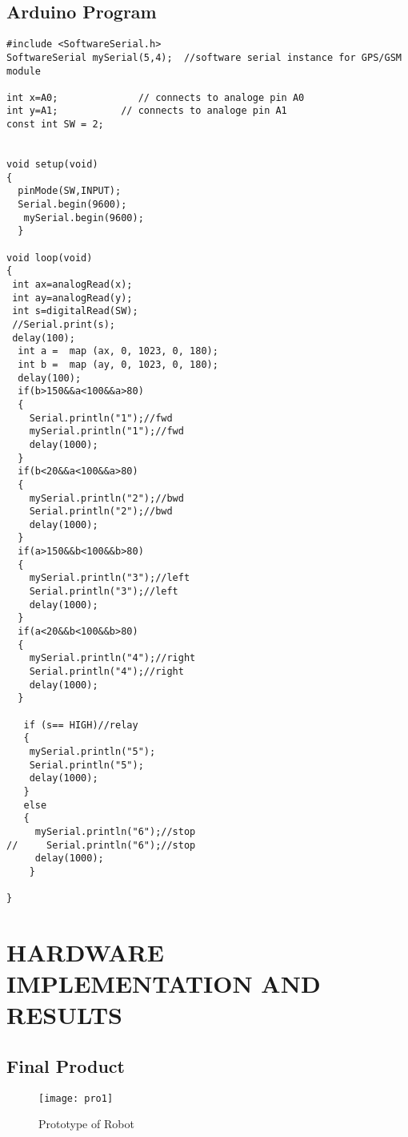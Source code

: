 \documentclass[12pt,a4paper]{report}
\begin{document}
\section{Arduino Program}
\begin{lstlisting}
#include <SoftwareSerial.h>
SoftwareSerial mySerial(5,4);  //software serial instance for GPS/GSM module

int x=A0;              // connects to analoge pin A0
int y=A1;           // connects to analoge pin A1
const int SW = 2;


void setup(void)
{
  pinMode(SW,INPUT);
  Serial.begin(9600);
   mySerial.begin(9600);
  }

void loop(void)
{
 int ax=analogRead(x);
 int ay=analogRead(y);
 int s=digitalRead(SW);
 //Serial.print(s); 
 delay(100);
  int a =  map (ax, 0, 1023, 0, 180);
  int b =  map (ay, 0, 1023, 0, 180);
  delay(100);
  if(b>150&&a<100&&a>80)
  {
    Serial.println("1");//fwd
    mySerial.println("1");//fwd
    delay(1000);
  }
  if(b<20&&a<100&&a>80)
  {
    mySerial.println("2");//bwd
    Serial.println("2");//bwd
    delay(1000);
  }
  if(a>150&&b<100&&b>80)
  {
    mySerial.println("3");//left
    Serial.println("3");//left
    delay(1000);
  }
  if(a<20&&b<100&&b>80)
  {
    mySerial.println("4");//right
    Serial.println("4");//right
    delay(1000);
  }
  
   if (s== HIGH)//relay
   {
    mySerial.println("5");
    Serial.println("5");
    delay(1000);
   }
   else
   {
     mySerial.println("6");//stop
//     Serial.println("6");//stop
     delay(1000);
    }

}

\end{lstlisting}
\chapter{{HARDWARE IMPLEMENTATION AND RESULTS}}
\section{Final Product}


\begin{figure}[h!]
\centering
\texttt{[image: pro1]}
\caption{Prototype of Robot}
\label{circuit}
\end{figure}
\end{document}
